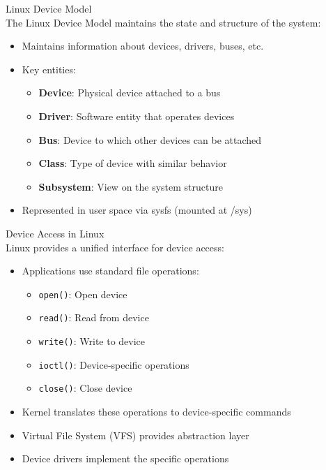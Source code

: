 \begin{definition}{Linux Device Model}\\
    The Linux Device Model maintains the state and structure of the system:
    \begin{itemize}
        \item Maintains information about devices, drivers, buses, etc.
        \item Key entities:
            \begin{itemize}
                \item \textbf{Device}: Physical device attached to a bus
                \item \textbf{Driver}: Software entity that operates devices
                \item \textbf{Bus}: Device to which other devices can be attached
                \item \textbf{Class}: Type of device with similar behavior
                \item \textbf{Subsystem}: View on the system structure
            \end{itemize}
        \item Represented in user space via sysfs (mounted at /sys)
    \end{itemize}
\end{definition}

\begin{concept}{Device Access in Linux}\\
    Linux provides a unified interface for device access:
    \begin{itemize}
        \item Applications use standard file operations:
            \begin{itemize}
                \item \texttt{open()}: Open device
                \item \texttt{read()}: Read from device
                \item \texttt{write()}: Write to device
                \item \texttt{ioctl()}: Device-specific operations
                \item \texttt{close()}: Close device
            \end{itemize}
        \item Kernel translates these operations to device-specific commands
        \item Virtual File System (VFS) provides abstraction layer
        \item Device drivers implement the specific operations
    \end{itemize}
\end{concept}

